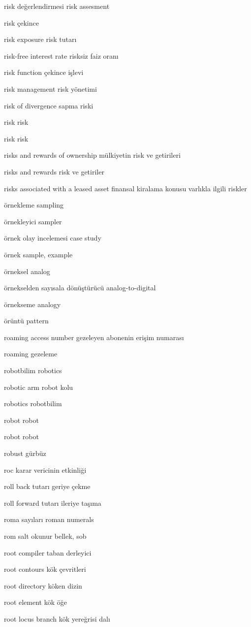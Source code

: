 \documentclass[12pt,fleqn]{article}\usepackage{../../common}
\begin{document}
risk değerlendirmesi risk assesment

risk çekince

risk exposure risk tutarı

risk-free interest rate risksiz faiz oranı

risk function çekince işlevi

risk management risk yönetimi

risk of divergence sapma riski

risk risk

risk risk

risks and rewards of ownership mülkiyetin risk ve getirileri

risks and rewards risk ve getiriler

risks associated with a leased asset finansal kiralama konusu varlıkla ilgili riskler

örnekleme sampling

örnekleyici sampler

örnek olay incelemesi case study

örnek sample, example

örneksel analog

örnekselden sayısala dönüştürücü analog-to-digital

örnekseme analogy

örüntü pattern

roaming access number gezeleyen abonenin erişim numarası

roaming gezeleme

robotbilim robotics

robotic arm robot kolu

robotics robotbilim

robot robot

robot robot

robust gürbüz

roc karar vericinin etkinliği

roll back tutarı geriye çekme

roll forward tutarı ileriye taşıma

roma sayıları roman numerals

rom salt okunur bellek, sob

root compiler taban derleyici

root contours kök çevritleri

root directory köken dizin

root element kök öğe

root locus branch kök yereğrisi dalı
\end{document}
